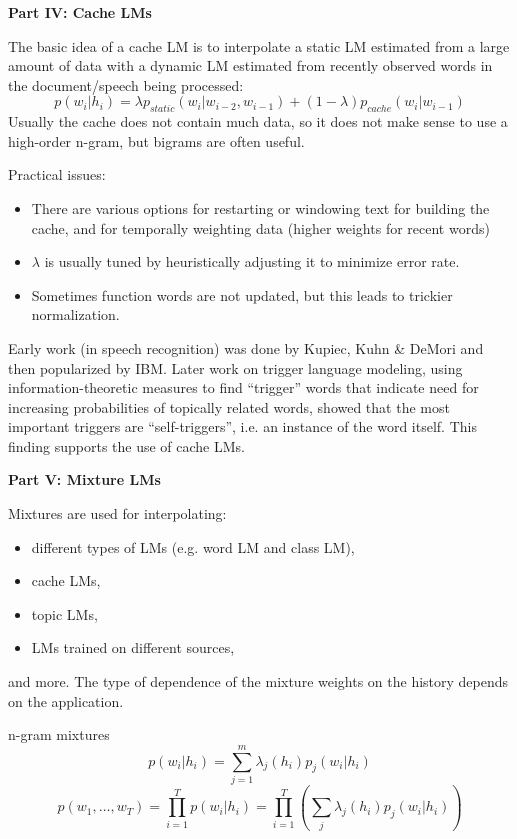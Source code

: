 \documentclass[11pt,titlepage]{article}
\begin{document}
\clearpage

\centerline{{\huge \bf Part IV: Cache LMs}}
\vskip 0.2in

The basic idea of a cache LM is to interpolate a static LM estimated
from a large amount of data with a dynamic LM estimated from recently
observed words in the document/speech being processed:
$$ p(w_i|h_i) = \lambda p_{static}(w_i|w_{i-2},w_{i-1}) +
(1-\lambda)p_{cache}(w_i|w_{i-1})$$ 
Usually the cache does not contain much data, so it does not make
sense to use a high-order n-gram, but bigrams are often useful.

Practical issues:
\begin{itemize}
\item There are various options for restarting or windowing text for building
the cache, and for temporally weighting data (higher weights for recent words)
\item $\lambda$ is usually tuned by heuristically adjusting it to minimize error
rate.
\item Sometimes function words are not updated, but 
this leads to trickier normalization.
\end{itemize}

\vskip 0.2in

Early work (in speech recognition) was done by Kupiec, Kuhn \& DeMori
and then popularized by IBM. Later work on trigger language modeling,
using information-theoretic measures to find ``trigger'' words that
indicate need for increasing probabilities of topically related words,
showed that the most important triggers are ``self-triggers'', i.e. an
instance of the word itself. This finding supports the use of cache LMs.

\clearpage


\centerline{{\huge \bf Part V: Mixture LMs}}
\vskip 0.2in


Mixtures are used for interpolating: 
\begin{itemize}
\item different types of LMs (e.g. word LM and class LM),
\item cache LMs, 
\item topic LMs,
\item LMs trained on different sources,
\end{itemize}
and more.  The type of dependence of the mixture weights
on the history depends on the application.


\vskip 0.2in

n-gram mixtures
$$p(w_i|h_i) = \sum_{j=1}^m \lambda_j(h_i)p_j(w_i|h_i)$$
$$p(w_1, \ldots , w_T) = \prod_{i=1}^T p(w_i|h_i) = \prod_{i=1}^T \left( \sum_j \lambda_j(h_i) p_j(w_i|h_i) \right)$$
\end{document}
